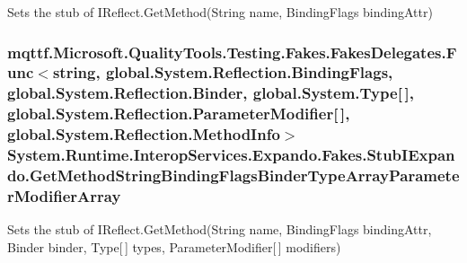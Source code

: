Sets the stub of I\-Reflect.\-Get\-Method(\-String name, Binding\-Flags binding\-Attr)

\hypertarget{class_system_1_1_runtime_1_1_interop_services_1_1_expando_1_1_fakes_1_1_stub_i_expando_a4eccb0dcb08ac242f275b65cdf50b5e5}{
\subsubsection[{Get\-Method\-String\-Binding\-Flags\-Binder\-Type\-Array\-Parameter\-Modifier\-Array}]{\setlength{\rightskip}{0pt plus 5cm}mqttf.\-Microsoft.\-Quality\-Tools.\-Testing.\-Fakes.\-Fakes\-Delegates.\-Func$<$string, global.\-System.\-Reflection.\-Binding\-Flags, global.\-System.\-Reflection.\-Binder, global.\-System.\-Type\mbox{[}$\,$\mbox{]}, global.\-System.\-Reflection.\-Parameter\-Modifier\mbox{[}$\,$\mbox{]}, global.\-System.\-Reflection.\-Method\-Info$>$ System.\-Runtime.\-Interop\-Services.\-Expando.\-Fakes.\-Stub\-I\-Expando.\-Get\-Method\-String\-Binding\-Flags\-Binder\-Type\-Array\-Parameter\-Modifier\-Array}}\label{class_system_1_1_runtime_1_1_interop_services_1_1_expando_1_1_fakes_1_1_stub_i_expando_a4eccb0dcb08ac242f275b65cdf50b5e5}


Sets the stub of I\-Reflect.\-Get\-Method(\-String name, Binding\-Flags binding\-Attr, Binder binder, Type\mbox{[}$\,$\mbox{]} types, Parameter\-Modifier\mbox{[}$\,$\mbox{]} modifiers)


